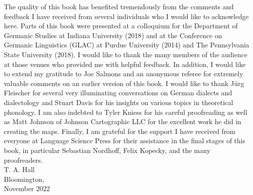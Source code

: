 \addchap{\lsAcknowledgementTitle} 

The quality of this book has benefited tremendously from the comments and feedback I have received from several individuals who I would like to acknowledge here. Parts of this book were presented at a colloquium for the Department of Germanic Studies at Indiana University (2018) and at the Conference on Germanic Linguistics (GLAC) at Purdue University (2014) and The Pennsylvania State University (2018). I would like to thank the many members of the audience at those venues who provided me with helpful feedback. In addition, I would like to extend my gratitude to Joe Salmons and an anonymous referee for extremely valuable comments on an earlier version of this book. I would like to thank Jürg Fleischer for several very illuminating conversations on German dialects and dialectology and Stuart Davis for his insights on various topics in theoretical phonology. I am also indebted to Tyler Kniess for his careful proofreading as well as Matt Johnson of Johnson Cartographic LLC for the excellent work he did in creating the maps. Finally, I am grateful for the support I have received from everyone at Language Science Press for their assistance in the final stages of this book, in particular Sebastian Nordhoff, Felix Kopecky, and the many proofreaders.\bigskip\\
\noindent T. A. Hall\\
\noindent Bloomington,\\
\noindent November 2022

